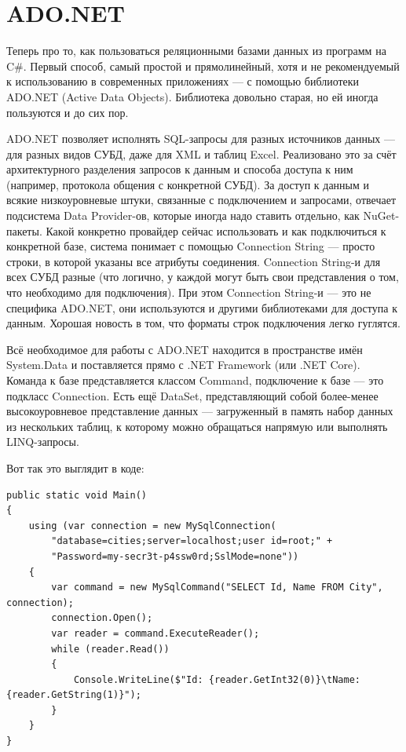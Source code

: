 \documentclass{../../text-style}
\begin{document}
\section{ADO.NET}

Теперь про то, как пользоваться реляционными базами данных из программ на C\#. Первый способ, самый простой и прямолинейный, хотя и не рекомендуемый к использованию в современных приложениях --- с помощью библиотеки ADO.NET (Active Data Objects). Библиотека довольно старая, но ей иногда пользуются и до сих пор.

ADO.NET позволяет исполнять SQL-запросы для разных источников данных --- для разных видов СУБД, даже для XML и таблиц Excel. Реализовано это за счёт архитектурного разделения запросов к данным и способа доступа к ним (например, протокола общения с конкретной СУБД). За доступ к данным и всякие низкоуровневые штуки, связанные с подключением и запросами, отвечает подсистема Data Provider-ов, которые иногда надо ставить отдельно, как NuGet-пакеты. Какой конкретно провайдер сейчас использовать и как подключиться к конкретной базе, система понимает с помощью Connection String --- просто строки, в которой указаны все атрибуты соединения. Connection String-и для всех СУБД разные (что логично, у каждой могут быть свои представления о том, что необходимо для подключения). При этом Connection String-и --- это не специфика ADO.NET, они используются и другими библиотеками для доступа к данным. Хорошая новость в том, что форматы строк подключения легко гуглятся.

Всё необходимое для работы с ADO.NET находится в пространстве имён System.Data и поставляется прямо с .NET Framework (или .NET Core). Команда к базе представляется классом Command, подключение к базе --- это подкласс Connection. Есть ещё DataSet, представляющий собой более-менее высокоуровневое представление данных --- загруженный в память набор данных из нескольких таблиц, к которому можно обращаться напрямую или выполнять LINQ-запросы.

Вот так это выглядит в коде:

\begin{verbatim}
public static void Main()
{
    using (var connection = new MySqlConnection(
        "database=cities;server=localhost;user id=root;" + 
        "Password=my-secr3t-p4ssw0rd;SslMode=none"))
    {
        var command = new MySqlCommand("SELECT Id, Name FROM City", connection);
        connection.Open();
        var reader = command.ExecuteReader();
        while (reader.Read())
        {
            Console.WriteLine($"Id: {reader.GetInt32(0)}\tName:{reader.GetString(1)}");
        }
    }
}
\end{verbatim}
\end{document}
